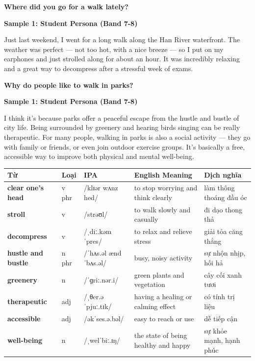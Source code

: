 \separator

\begin{ieltsquestion}
\textbf{Where did you go for a walk lately?}
\end{ieltsquestion}
\textbf{Sample 1: Student Persona (Band 7-8)}

Just last weekend, I went for a long walk along the Han River waterfront. The weather was perfect — not too hot, with a nice breeze — so I put on my earphones and just strolled along for about an hour. It was incredibly relaxing and a great way to decompress after a stressful week of exams.

\separator

\begin{ieltsquestion}
\textbf{Why do people like to walk in parks?}
\end{ieltsquestion}
\textbf{Sample 1: Student Persona (Band 7-8)}

I think it's because parks offer a peaceful escape from the hustle and bustle of city life. Being surrounded by greenery and hearing birds singing can be really therapeutic. For many people, walking in parks is also a social activity — they go with family or friends, or even join outdoor exercise groups. It's basically a free, accessible way to improve both physical and mental well-being.

\separator


\vspace{0.8em}
\begin{center}
\renewcommand{\arraystretch}{1.65}
\begin{tabularx}{\textwidth}{|V{0.22\textwidth}|C{0.07\textwidth}|I{0.20\textwidth}|Y|V{0.18\textwidth}|}
\hline
{}
\textbf{Từ} & \textbf{Loại} & \textbf{IPA} & \textbf{English Meaning} & \textbf{Dịch nghĩa} \\
\hline
\textbf{clear one's head} & v phr & /klɪər wʌnz hed/ & to stop worrying and think clearly & làm thông thoáng đầu óc \\ \hline
\textbf{stroll} & v & /strəʊl/ & to walk slowly and casually & đi dạo thong thả \\ \hline
\textbf{decompress} & v & /ˌdiː.kəmˈpres/ & to relax and relieve stress & giải tỏa căng thẳng \\ \hline
\textbf{hustle and bustle} & n phr & /ˈhʌs.əl ænd ˈbʌs.əl/ & busy, noisy activity & sự nhộn nhịp, hối hả \\ \hline
\textbf{greenery} & n & /ˈɡriː.nər.i/ & green plants and vegetation & cây cối xanh tươi \\ \hline
\textbf{therapeutic} & adj & /ˌθer.əˈpjuː.tɪk/ & having a healing or calming effect & có tính trị liệu \\ \hline
\textbf{accessible} & adj & /əkˈses.ə.bəl/ & easy to reach or use & dễ tiếp cận \\ \hline
\textbf{well-being} & n & /ˌwelˈbiː.ɪŋ/ & the state of being healthy and happy & sự khỏe mạnh, hạnh phúc \\ \hline
\end{tabularx}
\end{center}

